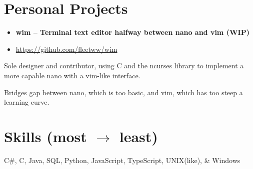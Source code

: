 \documentclass{article}
\newcommand{\ExpItem}[1]{\item #1}
\newcommand{\startexpitems}{
\begin{itemize}[leftmargin=.6cm]
}
\newcommand{\closeexpitems}{
\end{itemize}
}
\newcommand{\ProjectTitle}[1]{#1}
\newcommand{\ProjectShortDesc}[1]{#1}
\newcommand{\ProjectLink}[1]{\url{#1}}
\newcommand{\Project}[3]{
	\begin{itemize}[leftmargin=.125cm]
		\item[] {\textbf{\large #1 -- #2}} \item[] #3
	\end{itemize}
}
\begin{document}
\section*{Personal Projects}
\Project
	{\ProjectTitle{wim}}
	{\ProjectShortDesc{Terminal text editor halfway between nano and vim (WIP)}}
	{\ProjectLink{https://github.com/fleetww/wim}}
\startexpitems
	{\ExpItem{Sole designer and contributor, using C and the ncurses library to implement a more capable nano with a vim-like interface.}}
	{\ExpItem{Bridges gap between nano, which is too basic, and vim, which has too steep a learning curve.}}
\closeexpitems

\section*{Skills (most $\rightarrow$ least)}
C\#, C, Java, SQL, Python, JavaScript, TypeScript, UNIX(like), \& Windows
\end{document}
